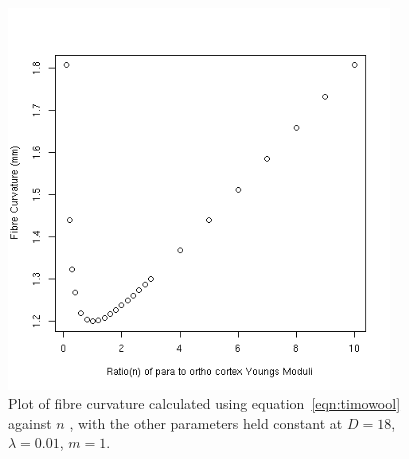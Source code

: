 %

\begin{figure}[!h]
  \centering
  \includegraphics[width=0.9\textwidth]{curvn.png}
  \caption{Plot of fibre curvature calculated using equation~\ref{eqn:timowool} against $n$ , with the other parameters held constant at $D=18$, $\lambda=0.01$, $m=1$.}
  \label{fig:curvn}
\end{figure}

%

